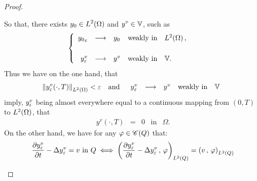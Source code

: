 \begin{proof}
\begin{enumerate}
            So that, there exists $\displaystyle y_{0}\in L^{2}\!\left({\Omega}\right)$
            and $\displaystyle y^{v}\in \mathbb{V}$, such as
            \begin{equation*}\label{eq:proof-thm-controllability-44}
                \begin{cases}\displaystyle
                    \begin{array}{rclll}
                        {y_{0}}_{\varepsilon} & \longrightarrow & y_{0} &
                        \text{weakly in} & L^{2}\!\left({\Omega}\right),\\
                        \\
                        y_{\varepsilon}^{v} & \longrightarrow & y^{v} &
                        \text{weakly in} & \mathbb{V}.
                    \end{array}
                \end{cases}
            \end{equation*}
            Thus we have on the one hand, that
            \begin{equation*}\label{eq:proof-thm-controllability-45}
                {\left\|{y_{\varepsilon}^{v}\!\left({\cdot,T}\right) }\right\|}_{L^{2}\left({\Omega}\right)} < \varepsilon
                \quad\text{and}\quad
                \begin{array}{rclll}
                    y_{\varepsilon}^{v} & \longrightarrow & y^{v} & \text{weakly
                    in} & \mathbb{V}
                \end{array}
            \end{equation*}
            imply, $y_{\varepsilon}^{v}$ being almost everywhere equal to a
            continuous mapping from $(0,T)$ to $L^{2}\!\left({\Omega}\right)$, that
            \begin{equation}\label{eq:proof-thm-controllability-46}
                \begin{array}{rclll}
                    y^{v}\!\left({\cdot, T}\right) & = & 0 & \text{in} &
                    \Omega.
                \end{array}
            \end{equation}
            On the other hand, we have for any $\varphi\in\mathscr{C}(Q)$ that:
            \begin{equation*}
                \begin{split}
                    {} & \primetemps{y_{\veps}^{v}} - \Delta y_{\veps}^{v}
                    = v\ \text{in}\ Q \iff \scalaireq{%
                        \primetemps{y_{\veps}^{v}} - \Delta y_{\veps}^{v}
                    }{\vphi} = \scalaireq{v}{\vphi}\\

\end{split}
\end{equation*}
\end{enumerate}
\end{proof}
